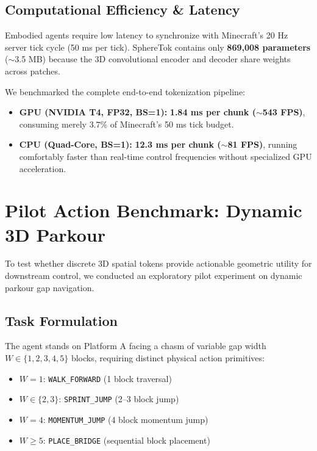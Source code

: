 \documentclass[10pt,twocolumn,letterpaper]{article}
\begin{document}
\subsection{Computational Efficiency \& Latency}
Embodied agents require low latency to synchronize with Minecraft's 20 Hz server tick cycle (50 ms per tick). SphereTok contains only \textbf{869,008 parameters} ($\sim$3.5 MB) because the 3D convolutional encoder and decoder share weights across patches.

We benchmarked the complete end-to-end tokenization pipeline:
\begin{itemize}[leftmargin=*]
    \item \textbf{GPU (NVIDIA T4, FP32, BS=1):} \textbf{1.84 ms per chunk ($\sim$543 FPS)}, consuming merely $3.7\%$ of Minecraft's 50 ms tick budget.
    \item \textbf{CPU (Quad-Core, BS=1):} \textbf{12.3 ms per chunk ($\sim$81 FPS)}, running comfortably faster than real-time control frequencies without specialized GPU acceleration.
\end{itemize}

\section{Pilot Action Benchmark: Dynamic 3D Parkour}

To test whether discrete 3D spatial tokens provide actionable geometric utility for downstream control, we conducted an exploratory pilot experiment on dynamic parkour gap navigation.

\subsection{Task Formulation}
The agent stands on Platform A facing a chasm of variable gap width $W \in \{1, 2, 3, 4, 5\}$ blocks, requiring distinct physical action primitives:
\begin{itemize}[leftmargin=*,noitemsep,topsep=2pt]
    \item $W = 1$: \texttt{WALK\_FORWARD} (1 block traversal)
    \item $W \in \{2, 3\}$: \texttt{SPRINT\_JUMP} (2--3 block jump)
    \item $W = 4$: \texttt{MOMENTUM\_JUMP} (4 block momentum jump)
    \item $W \geq 5$: \texttt{PLACE\_BRIDGE} (sequential block placement)
\end{itemize}
\end{document}
